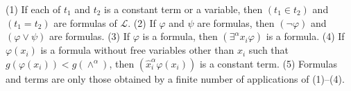 (1) If each of $t_1$ and $t_2$ is a constant term or a variable, then $(t_1 \in t_2)$ and $(t_1 = t_2)$ are formulas of $\mathcal{L}$.
(2) If $\varphi$ and $\psi$ are formulas, then $(\neg \varphi)$ and $(\varphi \vee \psi)$ are formulas.
(3) If $\varphi$ is a formula, then $(\exists^\alpha x_i \varphi)$ is a formula.
(4) If $\varphi(x_i)$ is a formula without free variables other than $x_i$ such that $g(\varphi(x_i)) < g(\wedge^\alpha)$, then $(\hat{x}_i^\alpha \varphi(x_i))$ is a constant term.
(5) Formulas and terms are only those obtained by a finite number of applications of (1)–(4).
